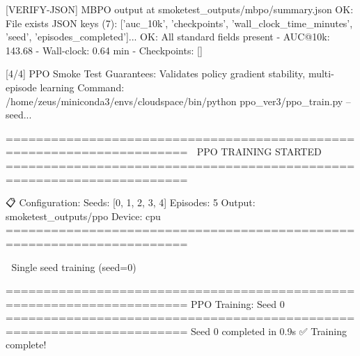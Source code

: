 [VERIFY-JSON] MBPO output at smoketest_outputs/mbpo/summary.json
   OK: File exists
   JSON keys (7): ['auc_10k', 'checkpoints', 'wall_clock_time_minutes', 'seed', 'episodes_completed']...
   OK: All standard fields present
   - AUC@10k: 143.68
   - Wall-clock: 0.64 min
   - Checkpoints: []

[4/4] PPO Smoke Test
   Guarantees: Validates policy gradient stability, multi-episode learning
   Command: /home/zeus/miniconda3/envs/cloudspace/bin/python ppo_ver3/ppo_train.py --seed...

======================================================================
🚀 PPO TRAINING STARTED
======================================================================

📋 Configuration:
   Seeds: [0, 1, 2, 3, 4]
   Episodes: 5
   Output: smoketest_outputs/ppo
   Device: cpu
======================================================================

📍 Single seed training (seed=0)

======================================================================
PPO Training: Seed 0
======================================================================
Seed 0 completed in 0.9s
✅ Training complete!


